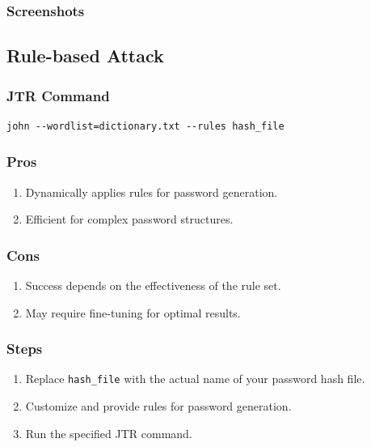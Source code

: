\documentclass[11pt]{article}
\begin{document}
\subsubsection{Screenshots}


\subsection{Rule-based Attack}

\subsubsection{JTR Command}

\begin{verbatim}
john --wordlist=dictionary.txt --rules hash_file
\end{verbatim}

\subsubsection{Pros}

\begin{enumerate}
    \item Dynamically applies rules for password generation.
    \item Efficient for complex password structures.
\end{enumerate}

\subsubsection{Cons}

\begin{enumerate}
    \item Success depends on the effectiveness of the rule set.
    \item May require fine-tuning for optimal results.
\end{enumerate}

\subsubsection{Steps}

\begin{enumerate}
    \item Replace \texttt{hash\_file} with the actual name of your password hash file.
    \item Customize and provide rules for password generation.
    \item Run the specified JTR command.
\end{enumerate}
\end{document}
